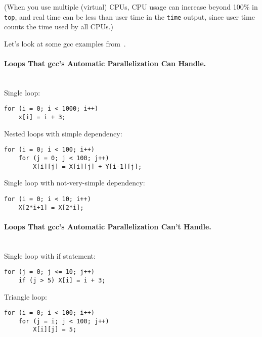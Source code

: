 (When you use multiple (virtual) CPUs, CPU usage can increase beyond
100\% in {\tt top}, and real time can be less than user time in
the {\tt time} output, since user time counts the time used by all CPUs.)

Let's look at some gcc examples from~\cite{autopar:related}.

\paragraph{Loops That gcc's Automatic Parallelization Can Handle.}~\\

  Single loop:
  \begin{verbatim}
for (i = 0; i < 1000; i++)
    x[i] = i + 3;
  \end{verbatim}

  Nested loops with simple dependency:
  \begin{verbatim}
for (i = 0; i < 100; i++)
    for (j = 0; j < 100; j++)
        X[i][j] = X[i][j] + Y[i-1][j];
  \end{verbatim}

  Single loop with not-very-simple dependency:
  \begin{verbatim}
for (i = 0; i < 10; i++)
    X[2*i+1] = X[2*i];
  \end{verbatim}

\paragraph{Loops That gcc's Automatic Parallelization Can't Handle.}~\\

  Single loop with if statement:
  \begin{verbatim}
for (j = 0; j <= 10; j++)
    if (j > 5) X[i] = i + 3;
  \end{verbatim}

  Triangle loop:
  \begin{verbatim}
for (i = 0; i < 100; i++)
    for (j = i; j < 100; j++)
        X[i][j] = 5;
  \end{verbatim}

